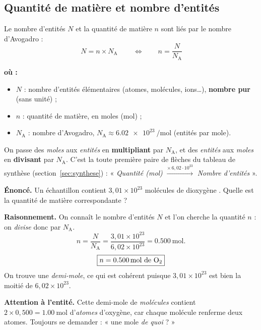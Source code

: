 \documentclass[11pt,a4paper]{article}
\newenvironment{ou}{%
  \par\smallskip\noindent\textbf{où :}\nopagebreak
  \begin{itemize}[leftmargin=1.8em,topsep=2pt,itemsep=1.5pt,parsep=0pt]}%
  {\end{itemize}}
\newcommand{\NA}{N_{\!\text{A}}}
\begin{document}
\subsection{Quantité de matière et nombre d'entités}

\begin{formule}
Le nombre d'entités $N$ et la quantité de matière $n$ sont liés par le nombre d'Avogadro :
\[ \boxed{\,N = n \times \NA\,}\qquad\Longleftrightarrow\qquad n = \dfrac{N}{\NA} \]
\begin{ou}
  \item $N$ : nombre d'entités élémentaires (atomes, molécules, ions\ldots), \textbf{nombre pur} (sans unité) ;
  \item $n$ : quantité de matière, en moles (\si{\mole}) ;
  \item $\NA$ : nombre d'Avogadro, $\NA \approx \SI{6.02e23}{\per\mole}$ (entités par mole).
\end{ou}
\end{formule}

\begin{remarque}
On passe des \emph{moles} aux \emph{entités} en \textbf{multipliant} par $\NA$, et des \emph{entités}
aux \emph{moles} en \textbf{divisant} par $\NA$. C'est la toute première paire de flèches du tableau
de synthèse (section~\ref{sec:synthese}) : « \emph{Quantité (mol)} $\xrightarrow{\times\,6{,}02\cdot10^{23}}$
\emph{Nombre d'entités} ».
\end{remarque}

\begin{exemple}
\textbf{Énoncé.} Un échantillon contient $3{,}01\times10^{23}$ molécules de dioxygène . Quelle
est la quantité de matière correspondante ?

\smallskip
\textbf{Raisonnement.} On connaît le nombre d'entités $N$ et l'on cherche la quantité $n$ : on
\emph{divise} donc par $\NA$.
\[ n = \frac{N}{\NA} = \frac{3{,}01\times10^{23}}{6{,}02\times10^{23}} = \SI{0.500}{\mole}. \]
\[ \boxed{n = \SI{0.500}{\mole}\ \text{de \ce{O2}}} \]
On trouve une \emph{demi-mole}, ce qui est cohérent puisque $3{,}01\times10^{23}$ est bien la moitié
de $6{,}02\times10^{23}$.

\smallskip
\textbf{Attention à l'entité.} Cette demi-mole de \emph{molécules}  contient
$2\times0{,}500 = \SI{1.00}{\mole}$ d'\emph{atomes} d'oxygène, car chaque molécule  renferme
deux atomes. Toujours se demander : « une mole \emph{de quoi} ? »
\end{exemple}
\end{document}
